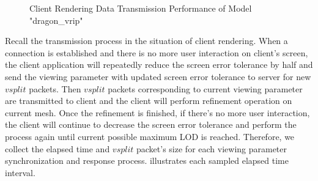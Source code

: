 \begin{figure}
\centering
{}
\label{fig:dragon_vrip_trans_perf}
\caption{Client Rendering Data Transmission Performance of Model "dragon\_vrip"}
\end{figure}
Recall the transmission process in the situation of client rendering. When a connection is established and there is no more user interaction on client's screen, the client application will repeatedly reduce the screen error tolerance by half and send the viewing  parameter with updated screen error tolerance to server for new $vsplit$ packets. Then $vsplit$ packets corresponding to current viewing parameter are transmitted to client and the client will perform refinement operation on current mesh. Once the refinement is finished, if there's no more user interaction,  the client will continue to decrease the screen error tolerance and perform the process again until current possible maximum LOD is reached. Therefore, we collect the elapsed time and $vsplit$ packet's size for each viewing parameter synchronization and response process.  illustrates each sampled elapsed time interval. \\

